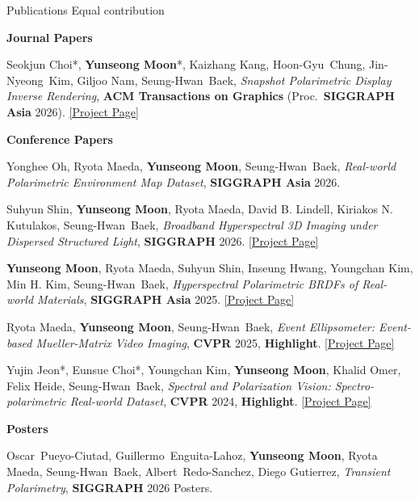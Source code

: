 \documentclass{cv}
\newcommand{\me}{\textbf{Yunseong Moon}}
\newcommand{\project}[1]{\href{#1}{\textcolor{linkblue}{[Project Page]}}}
\newcommand{\nm}[1]{\mbox{#1}}
\begin{document}
\begin{rSection}{Publications}
{\small * Equal contribution}

\textbf{Journal Papers}
\begin{refs}[label={[J\arabic*]}]
\item Seokjun Choi*, \me*, Kaizhang Kang, \nm{Hoon-Gyu Chung}, \nm{Jin-Nyeong Kim}, Giljoo Nam, \nm{Seung-Hwan Baek},
\emph{Snapshot Polarimetric Display Inverse Rendering},
\textbf{ACM Transactions on Graphics} (Proc.\ \textbf{SIGGRAPH Asia} 2026).
\project{https://michaelcsj.github.io/PDIR/}
\end{refs}

\textbf{Conference Papers}
\begin{refs}[label={[C\arabic*]}]
\item Yonghee Oh, Ryota Maeda, \me, \nm{Seung-Hwan Baek},
\emph{Real-world Polarimetric Environment Map Dataset},
\textbf{SIGGRAPH Asia} 2026.

\item Suhyun Shin, \me, Ryota Maeda, David B. Lindell, Kiriakos N. Kutulakos, \nm{Seung-Hwan Baek},
\emph{Broadband Hyperspectral 3D Imaging under Dispersed Structured Light},
\textbf{SIGGRAPH} 2026.
\project{https://shshin1210.github.io/BH3D/}

\item \me, Ryota Maeda, Suhyun Shin, Inseung Hwang, Youngchan Kim, Min H. Kim, \nm{Seung-Hwan Baek},
\emph{Hyperspectral Polarimetric BRDFs of Real-world Materials},
\textbf{SIGGRAPH Asia} 2025.
\project{https://yunseong0518.github.io/projects/hpBRDF/}

\item Ryota Maeda, \me, \nm{Seung-Hwan Baek},
\emph{Event Ellipsometer: Event-based Mueller-Matrix Video Imaging},
\textbf{CVPR} 2025, \textbf{Highlight}.
\project{https://elerac.github.io/projects/eventellipsometer/}

\item Yujin Jeon*, Eunsue Choi*, Youngchan Kim, \me, Khalid Omer, Felix Heide, \nm{Seung-Hwan Baek},
\emph{Spectral and Polarization Vision: Spectro-polarimetric Real-world Dataset},
\textbf{CVPR} 2024, \textbf{Highlight}.
\project{https://eschoi.com/SPDataset/}
\end{refs}

\textbf{Posters}
\begin{refs}[label={[P\arabic*]}]
\item \nm{Oscar Pueyo-Ciutad}, \nm{Guillermo Enguita-Lahoz}, \me, Ryota Maeda, \nm{Seung-Hwan Baek}, \nm{Albert Redo-Sanchez}, Diego Gutierrez,
\emph{Transient Polarimetry},
\textbf{SIGGRAPH} 2026 Posters.
\end{refs}

\end{rSection}
\end{document}
